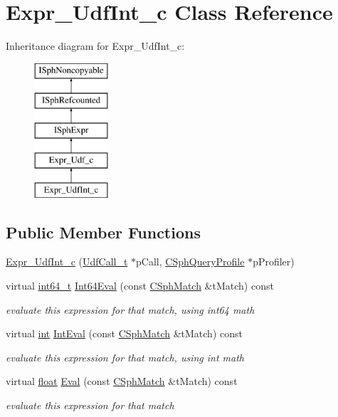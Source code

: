 \hypertarget{classExpr__UdfInt__c}{\section{Expr\-\_\-\-Udf\-Int\-\_\-c Class Reference}
\label{classExpr__UdfInt__c}
}
Inheritance diagram for Expr\-\_\-\-Udf\-Int\-\_\-c\-:\begin{figure}[H]
\begin{center}
\leavevmode
\includegraphics[height=5.000000cm]{classExpr__UdfInt__c}
\end{center}
\end{figure}
\subsection*{Public Member Functions}
\begin{DoxyCompactItemize}
\item 
\hyperlink{classExpr__UdfInt__c_acc47d5583404247dc851bfcd269e3ae0}{Expr\-\_\-\-Udf\-Int\-\_\-c} (\hyperlink{structUdfCall__t}{Udf\-Call\-\_\-t} $\ast$p\-Call, \hyperlink{classCSphQueryProfile}{C\-Sph\-Query\-Profile} $\ast$p\-Profiler)
\item 
virtual \hyperlink{sphinxstd_8h_a996e72f71b11a5bb8b3b7b6936b1516d}{int64\-\_\-t} \hyperlink{classExpr__UdfInt__c_ae6c0a1128fb3760f7a08c5855f43b329}{Int64\-Eval} (const \hyperlink{classCSphMatch}{C\-Sph\-Match} \&t\-Match) const 
\begin{DoxyCompactList}\small\item\em evaluate this expression for that match, using int64 math \end{DoxyCompactList}\item 
virtual \hyperlink{sphinxexpr_8cpp_a4a26e8f9cb8b736e0c4cbf4d16de985e}{int} \hyperlink{classExpr__UdfInt__c_a6bef2ec50636d2137aa5dfdc183a2487}{Int\-Eval} (const \hyperlink{classCSphMatch}{C\-Sph\-Match} \&t\-Match) const 
\begin{DoxyCompactList}\small\item\em evaluate this expression for that match, using int math \end{DoxyCompactList}\item 
virtual \hyperlink{sphinxexpr_8cpp_a0e0d0739f7035f18f949c2db2c6759ec}{float} \hyperlink{classExpr__UdfInt__c_a5a4c9e22b9a2cb0f0fda30fcb2bb3ec0}{Eval} (const \hyperlink{classCSphMatch}{C\-Sph\-Match} \&t\-Match) const 
\begin{DoxyCompactList}\small\item\em evaluate this expression for that match \end{DoxyCompactList}\end{DoxyCompactItemize}
